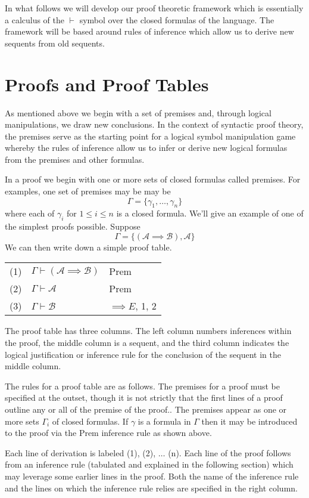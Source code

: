 \documentclass[12pt]{article}
\theoremstyle{break}
\theoremstyle{break}
\theoremstyle{break}
\theoremstyle{break}
\theoremstyle{break}
\newtheorem{informal definition}[definition]{Informal Definition}
\newcommand{\mc}[1]{\mathcal{#1}}
\begin{document}
In what follows we will develop our proof theoretic framework which is essentially a calculus of the $\vdash$ symbol over the closed formulas of the language.
The framework will be based around rules of inference which allow us to derive new sequents from old sequents.

\section{Proofs and Proof Tables}

As mentioned above we begin with a set of premises and, through logical manipulations, we draw new conclusions.
In the context of syntactic proof theory, the premises serve as the starting point for a logical symbol manipulation game whereby the rules of inference allow us to infer or derive new logical formulas from the premises and other formulas.

In a proof we begin with one or more sets of closed formulas called premises.
For examples, one set of premises may be may be
$$
\Gamma = \{\gamma_1, \ldots, \gamma_n\}
$$
where each of $\gamma_i$ for $1\le i \le n$ is a closed formula.
We'll give an example of one of the simplest proofs possible.
Suppose
$$
\Gamma = \{(\mc{A}\implies \mc{B}), \mc{A}\}
$$
We can then write down a simple proof table.
\begin{center}
\begin{tabular}{ p{1cm} p{6cm} p{3cm} }
(1) & $\Gamma \vdash (\mc{A} \implies \mc{B})$ & Prem\\
(2) & $\Gamma \vdash \mc{A}$ & Prem\\
(3) & $\Gamma \vdash \mc{B}$ & $\implies E$, 1, 2
\end{tabular}
\end{center}

The proof table has three columns.
The left column numbers inferences within the proof, the middle column is a sequent, and the third column indicates the logical justification or inference rule for the conclusion of the sequent in the middle column.

The rules for a proof table are as follows.
The premises for a proof must be specified at the outset, though it is not strictly that the first lines of a proof outline any or all of the premise of the proof..
The premises appear as one or more sets $\Gamma_i$ of closed formulas.
If $\gamma$ is a formula in $\Gamma$ then it may be introduced to the proof via the Prem inference rule as shown above.

Each line of derivation is labeled (1), (2), $\ldots$ (n).
Each line of the proof follows from an inference rule (tabulated and explained in the following section) which may leverage some earlier lines in the proof.
Both the name of the inference rule and the lines on which the inference rule relies are specified in the right column.
\end{document}
